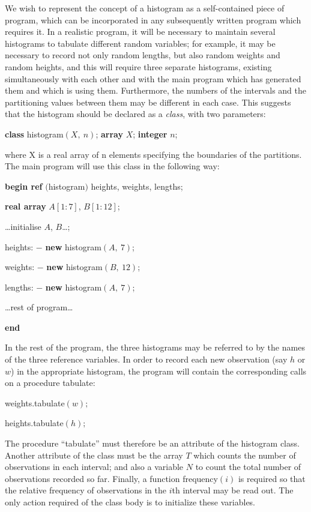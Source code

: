 We wish to represent the concept of a histogram as a self-contained piece of program, which can be incorporated in any subsequently written program which requires it. In a realistic program, it will be necessary to maintain several histograms to tabulate different random variables; for example, it may be necessary to record not only random lengths, but also random weights and random heights, and this will require three separate histograms, existing simultaneously with each other and with the main program which has generated them and which is using them. Furthermore, the numbers of the intervals and the partitioning values between them may be different in each case. This suggests that the histogram should be declared as a \textit{class}, with two parameters:

\quad \textbf{class} histogram$(X,\ n)$; \textbf{array} $X$; \textbf{integer} $n$;

where X is a real array of n elements specifying the boundaries of the partitions. The main program will use this class in the following way:

\quad \textbf{begin ref} $($histogram$)$ heights, weights, lengths;

\quad \quad \textbf{real array} $A[1:7]$, $B[1:12]$;

\quad \quad \dots initialise $A$, $B$\dots;

\quad \quad heights: $-$ \textbf{new} histogram$(A,\ 7)$;

\quad \quad weights: $-$ \textbf{new} histogram$(B,\ 12)$;

\quad \quad lengths: $-$ \textbf{new} histogram$(A,\ 7)$;

\quad \quad \dots rest of program\dots

\quad \textbf{end}

In the rest of the program, the three histograms may be referred to by the names of the three reference variables. In order to record each new observation (say $h$ or $w$) in the appropriate histogram, the program will contain the corresponding calls on a procedure tabulate:

\quad weights.tabulate$(w);$

\quad heights.tabulate$(h);$

The procedure ``tabulate'' must therefore be an attribute of the histogram class. Another attribute of the class must be the array $T$ which counts the number of observations in each interval; and also a variable $N$ to count the total number of observations recorded so far. Finally, a function frequency$(i)$ is required so that the relative frequency of observations in the $i$th interval may be read out. The only action required of the class body is to initialize these variables.

